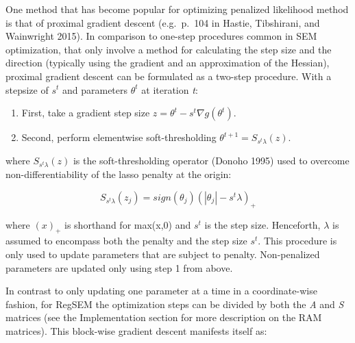 \documentclass[article]{jss}
\begin{document}
One method that has become popular for optimizing penalized likelihood
method is that of proximal gradient descent (e.g.~p.~104 in Hastie,
Tibshirani, and Wainwright 2015). In comparison to one-step procedures
common in SEM optimization, that only involve a method for calculating
the step size and the direction (typically using the gradient and an
approximation of the Hessian), proximal gradient descent can be
formulated as a two-step procedure. With a stepsize of \(s^{t}\) and
parameters \(\theta^{t}\) at iteration \textit{t}:

\begin{enumerate}
    \item First, take a gradient step size $z = \theta^{t} - s^{t} \nabla g(\theta^{t})$.
    \item Second, perform elementwise soft-thresholding $\theta^{t+1} = S_{s^{t} \lambda}(z)$.
\end{enumerate}

where \(S_{s^{t} \lambda}(z)\) is the soft-thresholding operator (Donoho
1995) used to overcome non-differentiability of the lasso penalty at the
origin:

\begin{equation}
S_{s^{t} \lambda}(z_{j}) = sign(\theta_{j})(|\theta_{j}|-s^{t} \lambda)_{+}
\end{equation}

where \((x)_{+}\) is shorthand for max(x,0) and \(s^{t}\) is the step
size. Henceforth, \(\lambda\) is assumed to encompass both the penalty
and the step size \(s^{t}\). This procedure is only used to update
parameters that are subject to penalty. Non-penalized parameters are
updated only using step 1 from above.

In contrast to only updating one parameter at a time in a
coordinate-wise fashion, for RegSEM the optimization steps can be
divided by both the \textit{A} and \textit{S} matrices (see the
Implementation section for more description on the RAM matrices). This
block-wise gradient descent manifests itself as:
\end{document}
